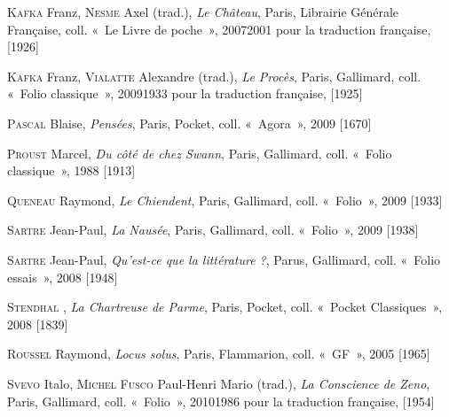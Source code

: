 \documentclass[12pt, a4paper]{article}
\begin{document}
		\textsc{Kafka} Franz, \textsc{Nesme} Axel (trad.), \textit{Le Château}, Paris, Librairie Générale Française, coll. «~Le Livre de poche~», 20072001 pour la traduction française,  [1926]\par 
		 
		
	
		\textsc{Kafka} Franz, \textsc{Vialatte} Alexandre (trad.), \textit{Le Procès}, Paris, Gallimard, coll. «~Folio classique~», 20091933 pour la traduction française,  [1925]\par 
		 
		
	
		\textsc{Pascal} Blaise, \textit{Pensées}, Paris, Pocket, coll. «~Agora~», 2009 [1670]\par 
		 
		
	
		\textsc{Proust} Marcel, \textit{Du côté de chez Swann}, Paris, Gallimard, coll. «~Folio classique~», 1988 [1913]\par 
		 
		
	
		\textsc{Queneau} Raymond, \textit{Le Chiendent}, Paris, Gallimard, coll. «~Folio~», 2009 [1933]\par 
		 
		
	
		\textsc{Sartre} Jean-Paul, \textit{La Nausée}, Paris, Gallimard, coll. «~Folio~», 2009 [1938]\par 
		 
		
	
		\textsc{Sartre} Jean-Paul, \textit{Qu'est-ce que la littérature ?}, Parus, Gallimard, coll. «~Folio essais~», 2008 [1948]\par 
		 
		
	
		\textsc{Stendhal} , \textit{La Chartreuse de Parme}, Paris, Pocket, coll. «~Pocket Classiques~», 2008 [1839]\par 
		 
		
	
		\textsc{Roussel} Raymond, \textit{Locus solus}, Paris, Flammarion, coll. «~GF~», 2005 [1965]\par 
		 
		
	
		\textsc{Svevo} Italo, \textsc{Michel Fusco} Paul-Henri Mario (trad.), \textit{La Conscience de Zeno}, Paris, Gallimard, coll. «~Folio~», 20101986 pour la traduction française,  [1954]\par 
		 
		
	
\end{document}
